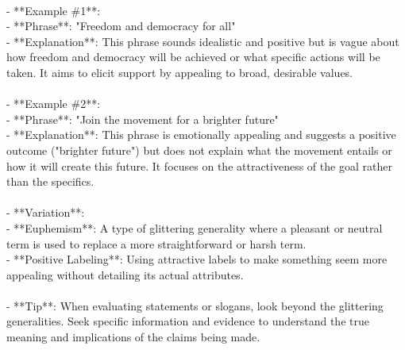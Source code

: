 \documentclass[a4paper,12pt,single,pdftex]{scrbook}
\begin{document}
    
      
    \\

    
      - **Example \#1**:
    \\

    
        - **Phrase**: "Freedom and democracy for all"
    \\

    
        - **Explanation**: This phrase sounds idealistic and positive but is vague about how freedom and democracy will be achieved or what specific actions will be taken. It aims to elicit support by appealing to broad, desirable values.
    \\

    
      
    \\

    
      - **Example \#2**:
    \\

    
        - **Phrase**: "Join the movement for a brighter future"
    \\

    
        - **Explanation**: This phrase is emotionally appealing and suggests a positive outcome ("brighter future") but does not explain what the movement entails or how it will create this future. It focuses on the attractiveness of the goal rather than the specifics.
    \\

    
      
    \\

    
      - **Variation**:
    \\

    
        - **Euphemism**: A type of glittering generality where a pleasant or neutral term is used to replace a more straightforward or harsh term.
    \\

    
        - **Positive Labeling**: Using attractive labels to make something seem more appealing without detailing its actual attributes.
    \\

    
      
    \\

    
      - **Tip**: When evaluating statements or slogans, look beyond the glittering generalities. Seek specific information and evidence to understand the true meaning and implications of the claims being made.
    \\
\end{document}
